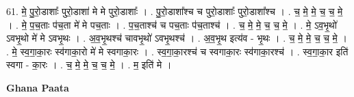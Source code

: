 \documentclass[17pt]{extarticle}
\begin{document}
61. मे॒ पु॒रो॒डाशाः᳚ पुरो॒डाशा॑ मे मे पुरो॒डाशाः᳚ । . पु॒रो॒डाशा᳚श्च च पुरो॒डाशाः᳚ पुरो॒डाशा᳚श्च । . च॒ मे॒ मे॒ च॒ च॒ मे॒ । . मे॒ प॒च॒ताः प॑च॒ता मे॑ मे पच॒ताः । . प॒च॒ताश्च॑ च पच॒ताः प॑च॒ताश्च॑ । . च॒ मे॒ मे॒ च॒ च॒ मे॒ । . मे॒ ऽव॒भृ॒थो॑ ऽवभृ॒थो मे॑ मे ऽवभृ॒थः । . अ॒व॒भृ॒थश्च॑ चावभृ॒थो॑ ऽवभृ॒थश्च॑ । . अ॒व॒भृ॒थ इत्य॑व - भृ॒थः । . च॒ मे॒ मे॒ च॒ च॒ मे॒ । . मे॒ स्व॒गा॒का॒रः स्व॑गाका॒रो मे॑ मे स्वगाका॒रः । . स्व॒गा॒का॒रश्च॑ च स्वगाका॒रः स्व॑गाका॒रश्च॑ । . स्व॒गा॒का॒र इति॑ स्वगा - का॒रः । . च॒ मे॒ मे॒ च॒ च॒ मे॒ । . म॒ इति॑ मे । \newline

\textbf{Ghana Paata } \newline
\end{document}
